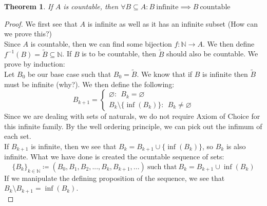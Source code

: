 \documentclass{article}
\newtheorem{thm}{Theorem}[section]
\begin{document}
\medskip
\begin{thm}
If $A$ is countable, then $\forall B \subseteq A: B \ \text{infinite} \implies B \ \text{countable}$
\end{thm}
\begin{proof}
We first see that $A$ is infinite as well as it has an infinite subset (How can we prove this?)\\

Since $A$ is countable, then we can find some bijection $f: \mathbb{N} \xrightarrow{} A$. We then define $f^{-1}(B) = \tilde{B} \subseteq \mathbb{N}$. If $B$ is to be countable, then $\tilde{B}$ should also be countable. We prove by induction:\\

Let $B_0$ be our base case such that $B_0 = \tilde{B}$. We know that if $B$ is infinite then $\tilde{B}$ must be infinite (why?). We then define the following:
\begin{equation*}
    B_{k+1} = \begin{cases}
        \varnothing: \ \ B_k = \varnothing\\
        B_k \setminus \{\inf(B_k)\}: \ \ B_k \neq \varnothing
    \end{cases}
\end{equation*}
Since we are dealing with sets of naturals, we do not require Axiom of Choice for this infinite family. By the well ordering principle, we can pick out the infimum of each set.\\

If $B_{k+1}$ is infinite, then we see that $B_k = B_{k+1} \cup \{\inf(B_k)\}$, so $B_k$ is also infinite. What we have done is created the ocuntable sequence of sets:
\begin{equation*}
    \{B_k\}_{k \in \mathbb{N}} \coloneq (B_0, B_1, B_2, ..., B_k, B_{k+1},...) \ \text{such that} \ B_k = B_{k+1} \cup \inf(B_k)
\end{equation*}
If we manipulate the defining proposition of the sequence, we see that $B_k \setminus B_{k+1} = \inf(B_k)$.\\


\end{proof}
\end{document}
